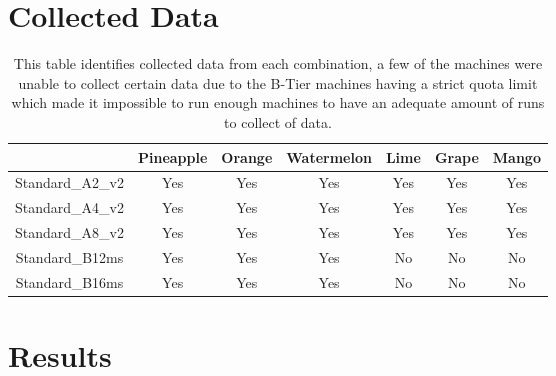 \section{Collected Data}

\begin{table}[ht!]
    \centering %
    \begin{tabular}{c c c c c c c} %
    \hline %
             & Pineapple & Orange & Watermelon & Lime  & Grape & Mango \\ [0.5ex] %
    \hline%
    Standard\_A2\_v2 & Yes & Yes & Yes & Yes & Yes & Yes  \\  [0.5ex] 
    Standard\_A4\_v2 & Yes & Yes & Yes & Yes & Yes & Yes  \\  [0.5ex] 
    Standard\_A8\_v2 & Yes & Yes & Yes & Yes & Yes & Yes  \\  [0.5ex] 
    Standard\_B12ms  & Yes & Yes & Yes  & No & No  & No  \\  [0.5ex] 
    Standard\_B16ms  & Yes & Yes & Yes  & No & No  & No  \\  [0.5ex] 
    \hline %
    \end{tabular}
    \caption{
This table identifies collected data from each combination, a few of the machines were unable to collect certain data due to the B-Tier machines having a strict quota limit which made it impossible to run enough machines to have an adequate amount of runs to collect of data.}
    \label{table:nonlin} %
\end{table}






\section{Results}
